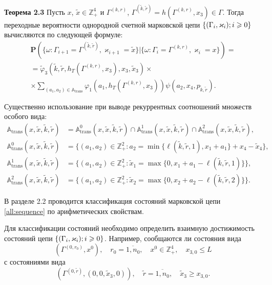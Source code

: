 \documentclass[14pt]{extarticle}
\renewcommand{\Pr}{{\mathsf P}}
\theoremstyle{theorem}
\theoremstyle{remark}
\renewcommand*{\hm}[1]{#1\nobreak\discretionary{}%
	{\hbox{$\mathsurround=0pt #1$}}{}}%
\newcommand{\Mark}{\{(\Gamma_i, \varkappa_i); \hm{} i \geqslant 0\}}
\renewcommand{\Pr}{{\mathbf P}}
\begin{document}
 {\bf Теорема 2.3}
{ 
Пусть $x$, $\tilde{x}\in \mathbb{Z}_+^4$ и $\Gamma^{(k,r)}$, $\Gamma^{(\tilde{k},\tilde{r})}=h(\Gamma^{(k,r)},x_3) \in \Gamma$. Тогда переходные вероятности однородной счетной марковской цепи $\Mark$ вычисляются по следующей формуле:
\begin{multline*}
\Pr (\{\omega\colon \Gamma_{i+1}=\Gamma^{(\tilde{k},\tilde{r})},\varkappa_{i+1}=\tilde{x} \}| \{\omega\colon \Gamma_{i}=\Gamma^{(k,r)},\varkappa_i=x\})=\\ 
=\widetilde{\varphi}_3(\tilde{k},\tilde{r},h_T(\Gamma^{(k,r)},x_3),x_3,\tilde{x}_3)\times \\ \times
\sum_{(a_1,a_2)\in {\mathbb A}_{\mathrm{trans}}}\varphi_1(a_1,h_T(\Gamma^{(k,r)},x_3))  \psi(a_2,x_4, p_{\tilde{k},\tilde{r}}).
\end{multline*}
}

Существенно использование при выводе рекуррентных соотношений множеств особого вида:
\begin{align*}
{\mathbb A}_{\mathrm{trans}}(x,\tilde{x},\tilde{k},\tilde{r}) &= {\mathbb A}_{\mathrm{trans}}^0(x,\tilde{x},\tilde{k},\tilde{r}) \cap {\mathbb A}_{\mathrm{trans}}^1(x,\tilde{x},\tilde{k},\tilde{r})\cap {\mathbb A}_{\mathrm{trans}}^2(x,\tilde{x},\tilde{k},\tilde{r}),\label{A:trans:1}\\
{\mathbb A}_{\mathrm{trans}}^0(x,\tilde{x},\tilde{k},\tilde{r}) &= \{(a_1,a_2) \in \mathbb{Z}_+^2 \colon a_2 = \min{\{\ell(\tilde{k},\tilde{r},1), x_1+a_1}\} +x_4-\tilde{x}_4\},\\
{\mathbb A}_{\mathrm{trans}}^1(x,\tilde{x},\tilde{k},\tilde{r}) &= \{(a_1,a_2) \in \mathbb{Z}_+^2 \colon \tilde{x}_1=\max{\{0,x_1+a_1-\ell(\tilde{k},\tilde{r},1)\}}\},\\
{\mathbb A}_{\mathrm{trans}}^2(x,\tilde{x},\tilde{k},\tilde{r}) &= \{(a_1,a_2) \in \mathbb{Z}_+^2 \colon  \tilde{x}_2=\max{\{0,x_2+a_2-\ell(\tilde{k},\tilde{r},2)\}}\}.
\end{align*}

В разделе 2.2 проводится классификация состояний марковской цепи \eqref{all:sequence} по арифметических свойствам. 

    Для классификации состояний необходимо определить взаимную достижимость состояний цепи  $\Mark$.
    Например, сообщаются ли состояния
    вида $$(\Gamma^{(0,r_0)},x^0), \quad r_0=\overline{1,n_0}, \quad x^0 \in \mathbb{Z}_+^4,\quad x_{3,0} \leqslant L$$
   с состояниями вида   $$(\Gamma^{(0,\tilde{r})},(0,0,\tilde{x}_3,0)), \quad \tilde{r} = \overline{1,n_0}, \quad \tilde{x}_3\geqslant x_{3,0}.$$
    
\end{document}
